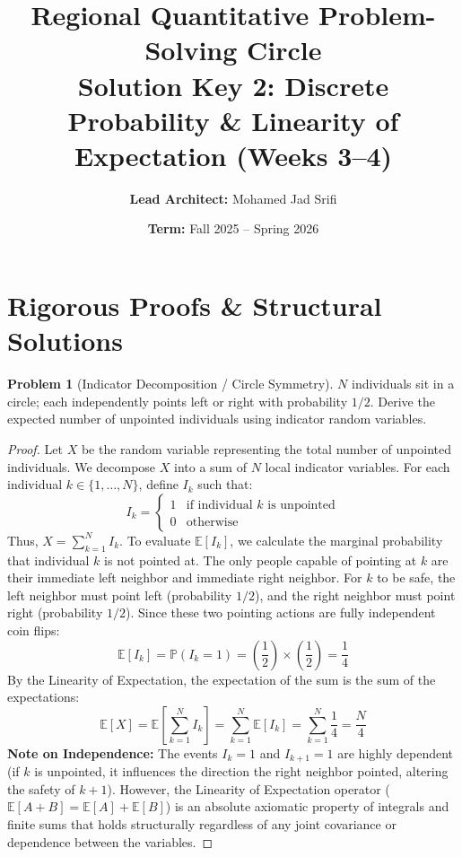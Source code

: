 \documentclass[11pt, a4paper]{article}
\theoremstyle{definition}
\newtheorem{problem}{Problem}
\theoremstyle{plain}
\begin{document}
\title{\vspace{-1.5cm}\textbf{Regional Quantitative Problem-Solving Circle} \\ \Large Solution Key 2: Discrete Probability \& Linearity of Expectation (Weeks 3--4)}
\author{\textbf{Lead Architect:} Mohamed Jad Srifi}
\date{\textbf{Term:} Fall 2025 -- Spring 2026}
\maketitle

\section*{Rigorous Proofs \& Structural Solutions}

\begin{problem}[Indicator Decomposition / Circle Symmetry]
$N$ individuals sit in a circle; each independently points left or right with probability $1/2$. Derive the expected number of unpointed individuals using indicator random variables.
\end{problem}

\begin{proof}
Let $X$ be the random variable representing the total number of unpointed individuals. We decompose $X$ into a sum of $N$ local indicator variables. 
For each individual $k \in \{1, \dots, N\}$, define $I_k$ such that:
\[
I_k = \begin{cases} 1 & \text{if individual } k \text{ is unpointed} \\ 0 & \text{otherwise} \end{cases}
\]
Thus, $X = \sum_{k=1}^N I_k$. To evaluate $\mathbb{E}[I_k]$, we calculate the marginal probability that individual $k$ is not pointed at. The only people capable of pointing at $k$ are their immediate left neighbor and immediate right neighbor. 
For $k$ to be safe, the left neighbor must point left (probability $1/2$), and the right neighbor must point right (probability $1/2$). Since these two pointing actions are fully independent coin flips:
\[
\mathbb{E}[I_k] = \mathbb{P}(I_k = 1) = \left(\frac{1}{2}\right) \times \left(\frac{1}{2}\right) = \frac{1}{4}
\]
By the Linearity of Expectation, the expectation of the sum is the sum of the expectations:
\[
\mathbb{E}[X] = \mathbb{E}\left[\sum_{k=1}^N I_k\right] = \sum_{k=1}^N \mathbb{E}[I_k] = \sum_{k=1}^N \frac{1}{4} = \frac{N}{4}
\]
\textbf{Note on Independence:} The events $I_k = 1$ and $I_{k+1} = 1$ are highly dependent (if $k$ is unpointed, it influences the direction the right neighbor pointed, altering the safety of $k+1$). However, the Linearity of Expectation operator ($\mathbb{E}[A + B] = \mathbb{E}[A] + \mathbb{E}[B]$) is an absolute axiomatic property of integrals and finite sums that holds structurally regardless of any joint covariance or dependence between the variables.
\end{proof}
\end{document}
